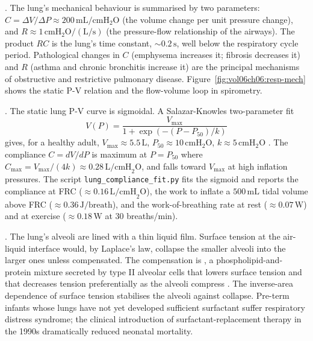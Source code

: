 . The lung's mechanical behaviour
is summarised by two parameters: 
$C = \Delta V/\Delta P \approx 200\,\text{mL}/\text{cmH}_2\text{O}$
(the volume change per unit pressure change), and  $R \approx 1\,\text{cmH}_2\text{O}/(\text{L}/\text{s})$
(the pressure-flow relationship of the airways). The product $RC$
is the lung's time constant, $\sim 0.2\,\text{s}$, well below the
respiratory cycle period. Pathological changes in $C$ (emphysema
increases it; fibrosis decreases it) and $R$ (asthma and chronic
bronchitis increase it) are the principal mechanisms of obstructive
and restrictive pulmonary disease.
Figure~\ref{fig:vol06ch06:resp-mech} shows the static P-V relation
and the flow-volume loop in spirometry.



. The static lung P-V curve is
sigmoidal. A Salazar-Knowles two-parameter fit
\[
V(P) = \frac{V_{\max}}{1 + \exp\!\left(-(P - P_{50})/k\right)}
\]
gives, for a healthy adult, $V_{\max} \approx 5.5\,\text{L}$,
$P_{50} \approx 10\,\text{cmH}_2\text{O}$, $k \approx 5\,\text{cmH}_2\text{O}$
\cite[p.~99]{paper:v6c06-salazar-knowles-1964}. The compliance
$C = dV/dP$ is maximum at $P = P_{50}$ where
$C_{\max} = V_{\max}/(4k) \approx 0.28\,\text{L/cmH}_2\text{O}$, and
falls toward $V_{\max}$ at high inflation pressures. The script
\texttt{lung\_compliance\_fit.py} fits the sigmoid and reports the
compliance at FRC ($\approx 0.16\,\text{L/cmH}_2\text{O}$), the
work to inflate a $500\,\text{mL}$ tidal volume above FRC
($\approx 0.36\,\text{J/breath}$), and the work-of-breathing rate at
rest ($\approx 0.07\,\text{W}$) and at exercise
($\approx 0.18\,\text{W}$ at $30$ breaths/min).

. The lung's alveoli are
lined with a thin liquid film. Surface tension at the air-liquid
interface would, by Laplace's law, collapse the smaller alveoli into
the larger ones unless compensated. The compensation is
, a phospholipid-and-protein mixture
secreted by type II alveolar cells that lowers surface tension and
that decreases tension preferentially as the alveoli compress
\cite[p.~171]{paper:v6c06-clements-1957}. The inverse-area
dependence of surface tension stabilises the alveoli against
collapse. Pre-term infants whose lungs have not yet developed
sufficient surfactant suffer respiratory distress syndrome; the
clinical introduction of surfactant-replacement therapy in the 1990s
dramatically reduced neonatal mortality.

